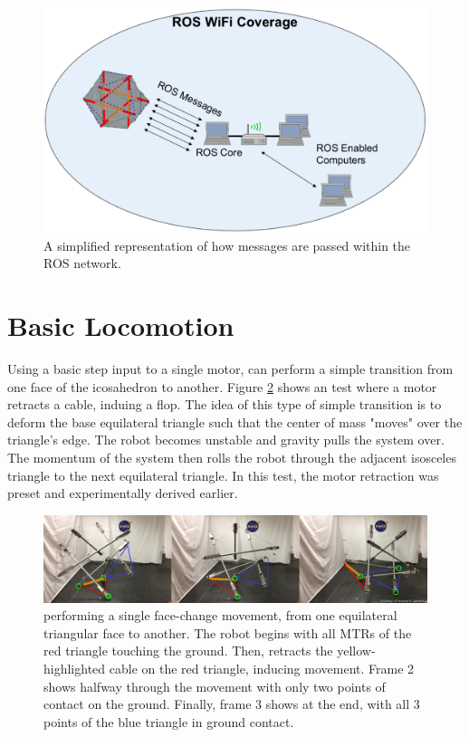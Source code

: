 \begin{figure}[thpb]%
      \centering
      \includegraphics[width=0.8\columnwidth]{tex/img/ROS_Wireless}
      \caption{A simplified representation of how messages are passed within the \SB{} ROS network.}
      \label{fig:ros_diagram}
\end{figure}

\section{Basic Locomotion}
\label{basic_locomotion}
Using a basic step input to a single motor, \SB{} can perform a simple transition from one face of the icosahedron to another.
Figure \ref{fig:superball_flop_flat} shows an test where a motor retracts a cable, induing a flop.
The idea of this type of simple transition is to deform the base equilateral triangle such that the center of mass "moves" over the triangle's edge.
The robot becomes unstable and gravity pulls the system over.
The momentum of the system then rolls the robot through the adjacent isosceles triangle to the next equilateral triangle.
In this test, the motor retraction was preset and experimentally derived earlier.

\begin{figure}[t]
    \centering
    \includegraphics[width=1\linewidth]{tex/img/superball_flop_combined_betterlabels}
    \caption{\SB{} performing a single face-change movement, from one equilateral triangular face to another. The robot begins with all MTRs of the red triangle touching the ground. Then, \SB{} retracts the yellow-highlighted cable on the red triangle, inducing movement. Frame 2 shows \SB{} halfway through the movement with only two points of contact on the ground. Finally, frame 3 shows \SB{} at the end, with all 3 points of the blue triangle in ground contact.}
    \label{fig:superball_flop_flat}
\end{figure}
